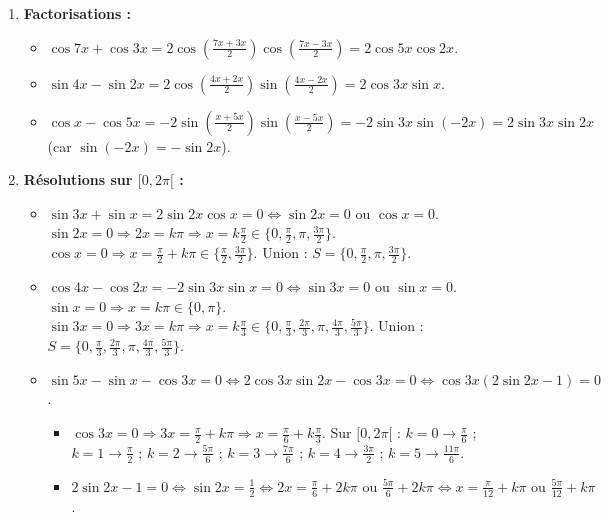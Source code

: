 \documentclass[11pt]{article}
\begin{document}
\begin{corrige}[Exercice n°1]
\begin{enumerate}
    \item \textbf{Factorisations :}
    \begin{itemize}
        \item[a)] $\cos 7x + \cos 3x = 2 \cos\left(\frac{7x+3x}{2}\right) \cos\left(\frac{7x-3x}{2}\right) = \boxed{2 \cos 5x \cos 2x}$.
        \item[b)] $\sin 4x - \sin 2x = 2 \cos\left(\frac{4x+2x}{2}\right) \sin\left(\frac{4x-2x}{2}\right) = \boxed{2 \cos 3x \sin x}$.
        \item[c)] $\cos x - \cos 5x = -2 \sin\left(\frac{x+5x}{2}\right) \sin\left(\frac{x-5x}{2}\right) = -2 \sin 3x \sin(-2x) = \boxed{2 \sin 3x \sin 2x}$ (car $\sin(-2x)=-\sin 2x$).
    \end{itemize}
    \item \textbf{Résolutions sur $[0, 2\pi[$ :}
    \begin{itemize}
        \item[a)] $\sin 3x + \sin x = 2 \sin 2x \cos x = 0 \iff \sin 2x=0 \text{ ou } \cos x=0$.
        $\sin 2x=0 \Rightarrow 2x=k\pi \Rightarrow x=k\frac{\pi}{2} \in \{0, \frac{\pi}{2}, \pi, \frac{3\pi}{2}\}$.
        $\cos x=0 \Rightarrow x=\frac{\pi}{2}+k\pi \in \{\frac{\pi}{2}, \frac{3\pi}{2}\}$.
        Union : $\boxed{S = \{0, \frac{\pi}{2}, \pi, \frac{3\pi}{2}\}}$.
        \item[b)] $\cos 4x - \cos 2x = -2 \sin 3x \sin x = 0 \iff \sin 3x=0 \text{ ou } \sin x=0$.
        $\sin x=0 \Rightarrow x=k\pi \in \{0, \pi\}$.
        $\sin 3x=0 \Rightarrow 3x=k\pi \Rightarrow x=k\frac{\pi}{3} \in \{0, \frac{\pi}{3}, \frac{2\pi}{3}, \pi, \frac{4\pi}{3}, \frac{5\pi}{3}\}$.
        Union : $\boxed{S = \{0, \frac{\pi}{3}, \frac{2\pi}{3}, \pi, \frac{4\pi}{3}, \frac{5\pi}{3}\}}$.
        \item[c)] $\sin 5x - \sin x - \cos 3x = 0 \iff 2 \cos 3x \sin 2x - \cos 3x = 0 \iff \cos 3x (2 \sin 2x - 1) = 0$.
        \begin{itemize}
            \item $\cos 3x = 0 \Rightarrow 3x = \frac{\pi}{2}+k\pi \Rightarrow x = \frac{\pi}{6}+k\frac{\pi}{3}$.
            Sur $[0, 2\pi[$ : $k=0 \to \frac{\pi}{6}$ ; $k=1 \to \frac{\pi}{2}$ ; $k=2 \to \frac{5\pi}{6}$ ; $k=3 \to \frac{7\pi}{6}$ ; $k=4 \to \frac{3\pi}{2}$ ; $k=5 \to \frac{11\pi}{6}$.
            \item $2\sin 2x - 1 = 0 \iff \sin 2x = \frac{1}{2} \iff 2x = \frac{\pi}{6}+2k\pi \text{ ou } \frac{5\pi}{6}+2k\pi \iff x = \frac{\pi}{12}+k\pi \text{ ou } \frac{5\pi}{12}+k\pi$.

\end{itemize}
\end{itemize}
\end{enumerate}
\end{corrige}
\end{document}
